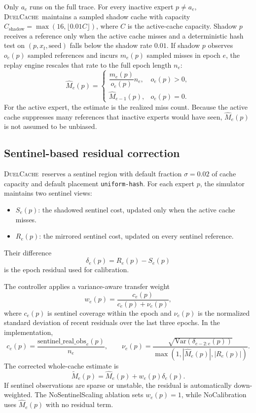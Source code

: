 \documentclass{article}
\newcommand{\duel}{\textsc{DuelCache}}
\newcommand{\rawm}{\hat{M}}
\newcommand{\corrm}{\tilde{M}}
\begin{document}
Only $a_e$ runs on the full trace. For every inactive expert $p \neq a_e$, \duel\ maintains a sampled shadow cache with capacity $C_{\mathrm{shadow}}=\max(16,\lfloor 0.01 C \rfloor)$, where $C$ is the active-cache capacity. Shadow $p$ receives a reference only when the active cache misses and a deterministic hash test on $(p,x_t,\mathrm{seed})$ falls below the shadow rate $0.01$. If shadow $p$ observes $o_e(p)$ sampled references and incurs $m_e(p)$ sampled misses in epoch $e$, the replay engine rescales that rate to the full epoch length $n_e$:
\[
\rawm_e(p)=
\begin{cases}
\dfrac{m_e(p)}{o_e(p)}n_e, & o_e(p) > 0,\\[4pt]
\rawm_{e-1}(p), & o_e(p)=0.
\end{cases}
\]
For the active expert, the estimate is the realized miss count. Because the active cache suppresses many references that inactive experts would have seen, $\rawm_e(p)$ is not assumed to be unbiased.

\subsection{Sentinel-based residual correction}

\duel\ reserves a sentinel region with default fraction $\sigma=0.02$ of cache capacity and default placement \texttt{uniform-hash}. For each expert $p$, the simulator maintains two sentinel views:
\begin{itemize}
\item $S_e(p)$: the shadowed sentinel cost, updated only when the active cache misses.
\item $R_e(p)$: the mirrored sentinel cost, updated on every sentinel reference.
\end{itemize}
Their difference
\[
\delta_e(p)=R_e(p)-S_e(p)
\]
is the epoch residual used for calibration.

The controller applies a variance-aware transfer weight
\[
w_e(p)=\frac{c_e(p)}{c_e(p)+\nu_e(p)},
\]
where $c_e(p)$ is sentinel coverage within the epoch and $\nu_e(p)$ is the normalized standard deviation of recent residuals over the last three epochs. In the implementation,
\[
c_e(p)=\frac{\text{sentinel\_real\_obs}_e(p)}{n_e},
\qquad
\nu_e(p)=\frac{\sqrt{\mathrm{Var}(\delta_{e-2:e}(p))}}{\max(1,|\rawm_e(p)|,|R_e(p)|)}.
\]
The corrected whole-cache estimate is
\[
\corrm_e(p)=\rawm_e(p)+w_e(p)\delta_e(p).
\]
If sentinel observations are sparse or unstable, the residual is automatically down-weighted. The NoSentinelScaling ablation sets $w_e(p)=1$, while NoCalibration uses $\rawm_e(p)$ with no residual term.
\end{document}
